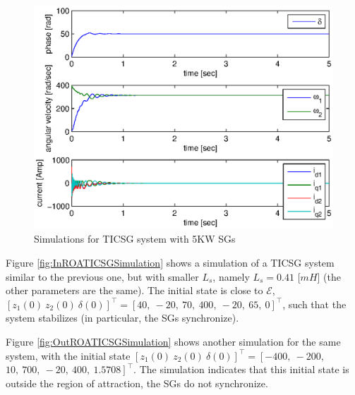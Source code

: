 \documentclass{ifacconf}
\newcommand{\m}      {{\hbox{\hskip 1pt}}}
\newcommand{\Emscr}  {{\mathcal{E}}}
\begin{document}
\begin{figure}[ht] %
\vspace{-2mm}
\includegraphics[scale=0.65]{5KWTICSGSimulation} \vspace{-8mm}
\caption{Simulations for TICSG system with 5KW SGs} 
\label{fig:5KWSGTICSGSimulation}
\end{figure}

Figure \ref{fig:InROATICSGSimulation} shows a simulation of a TICSG 
system similar to the previous one, but with smaller $L_s$, namely
$L_s=0.41$ {[}$mH${]} (the other parameters are the same). The
initial state is close to $\Emscr$, $\left[z_1(0)\ z_2(0)\ \delta(0)
\right]^\top=\left[40,\ -20,\ 70,\ 400,\ -20,\ 65,\ 0\right]^\top$, 
such that the system stabilizes (in particular, the SGs synchronize). 

Figure \ref{fig:OutROATICSGSimulation} shows another simulation for
the same system, with the initial state $\left[z_1(0)\ z_2(0) \
\delta(0) \right]^\top=\left[-400,\ -200,\right.$ $\left. 10,\ 700,\ 
-20,\ 400,\ 1.5708\right]^\top$. \m The simu\-lation indicates that 
this initial state is outside the region of attraction, the SGs do not
synchronize.
\end{document}
